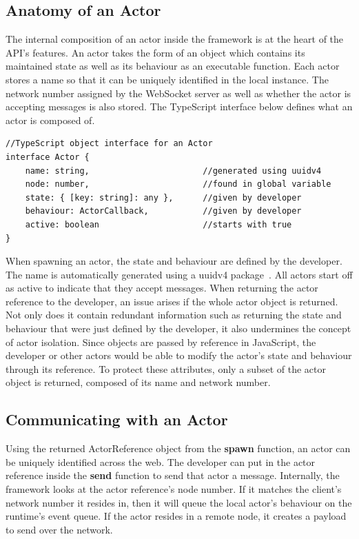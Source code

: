 \documentclass[lettersize,journal]{IEEEtran}
\begin{document}
\subsection{Anatomy of an Actor}
The internal composition of an actor inside the framework is at the heart of the API's features. An actor takes the form of an object which contains its maintained state as well as its behaviour as an executable function. Each actor stores a name so that it can be uniquely identified in the local instance. The network number assigned by the WebSocket server as well as whether the actor is accepting messages is also stored. The TypeScript interface below defines what an actor is composed of.
\begin{lstlisting}
//TypeScript object interface for an Actor
interface Actor {
    name: string,                       //generated using uuidv4
    node: number,                       //found in global variable
    state: { [key: string]: any },      //given by developer
    behaviour: ActorCallback,           //given by developer
    active: boolean                     //starts with true
}
\end{lstlisting}
When spawning an actor, the state and behaviour are defined by the developer. The name is automatically generated using a uuidv4 package~\cite{uuidv4}. All actors start off as active to indicate that they accept messages. When returning the actor reference to the developer, an issue arises if the whole actor object is returned. Not only does it contain redundant information such as returning the state and behaviour that were just defined by the developer, it also undermines the concept of actor isolation. Since objects are passed by reference in JavaScript, the developer or other actors would be able to modify the actor's state and behaviour through its reference. To protect these attributes, only a subset of the actor object is returned, composed of its name and network number.
\subsection{Communicating with an Actor}
Using the returned ActorReference object from the \textbf{spawn} function, an actor can be uniquely identified across the web. The developer can put in the actor reference inside the \textbf{send} function to send that actor a message. Internally, the framework looks at the actor reference's node number. If it matches the client's network number it resides in, then it will queue the local actor's behaviour on the runtime's event queue. If the actor resides in a remote node, it creates a payload to send over the network. 
\end{document}
